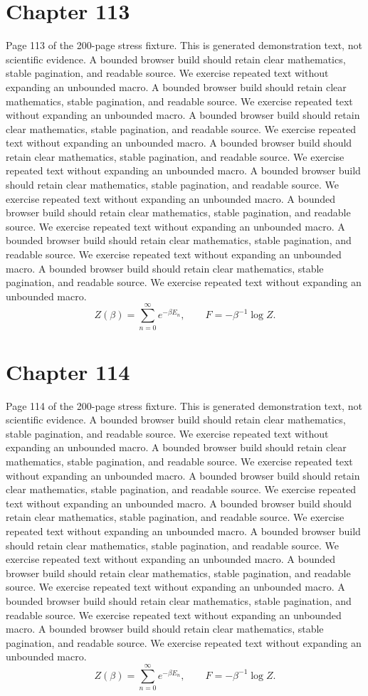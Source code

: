 \documentclass[11pt]{article}
\begin{document}
\section*{Chapter 113}
Page 113 of the 200-page stress fixture. This is generated demonstration text, not scientific evidence.
A bounded browser build should retain clear mathematics, stable pagination, and readable source. We exercise repeated text without expanding an unbounded macro.
A bounded browser build should retain clear mathematics, stable pagination, and readable source. We exercise repeated text without expanding an unbounded macro.
A bounded browser build should retain clear mathematics, stable pagination, and readable source. We exercise repeated text without expanding an unbounded macro.
A bounded browser build should retain clear mathematics, stable pagination, and readable source. We exercise repeated text without expanding an unbounded macro.
A bounded browser build should retain clear mathematics, stable pagination, and readable source. We exercise repeated text without expanding an unbounded macro.
A bounded browser build should retain clear mathematics, stable pagination, and readable source. We exercise repeated text without expanding an unbounded macro.
A bounded browser build should retain clear mathematics, stable pagination, and readable source. We exercise repeated text without expanding an unbounded macro.
A bounded browser build should retain clear mathematics, stable pagination, and readable source. We exercise repeated text without expanding an unbounded macro.
\[Z(\beta)=\sum_{n=0}^{\infty}e^{-\beta E_n},\qquad F=-\beta^{-1}\log Z.\]
\newpage
\section*{Chapter 114}
Page 114 of the 200-page stress fixture. This is generated demonstration text, not scientific evidence.
A bounded browser build should retain clear mathematics, stable pagination, and readable source. We exercise repeated text without expanding an unbounded macro.
A bounded browser build should retain clear mathematics, stable pagination, and readable source. We exercise repeated text without expanding an unbounded macro.
A bounded browser build should retain clear mathematics, stable pagination, and readable source. We exercise repeated text without expanding an unbounded macro.
A bounded browser build should retain clear mathematics, stable pagination, and readable source. We exercise repeated text without expanding an unbounded macro.
A bounded browser build should retain clear mathematics, stable pagination, and readable source. We exercise repeated text without expanding an unbounded macro.
A bounded browser build should retain clear mathematics, stable pagination, and readable source. We exercise repeated text without expanding an unbounded macro.
A bounded browser build should retain clear mathematics, stable pagination, and readable source. We exercise repeated text without expanding an unbounded macro.
A bounded browser build should retain clear mathematics, stable pagination, and readable source. We exercise repeated text without expanding an unbounded macro.
\[Z(\beta)=\sum_{n=0}^{\infty}e^{-\beta E_n},\qquad F=-\beta^{-1}\log Z.\]
\newpage
\end{document}
